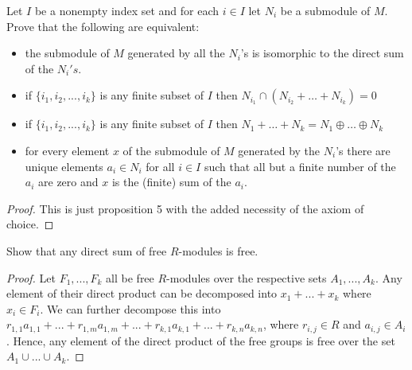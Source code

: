 \documentclass[10pt]{article}
\newenvironment{problem}[2][Problem]{\begin{trivlist}
		\item[\hskip \labelsep {\bfseries #1}\hskip \labelsep {\bfseries #2.}]}{\end{trivlist}}
\begin{document}
	\begin{problem}{3.21}
		Let $I$ be a nonempty index set and for each $i \in I$ let $N_i$ be a submodule of $M$. Prove that
		the following are equivalent:
		\begin{itemize}
			\item[\textbf{(i)}]the submodule of $M$ generated by all the $N_i$'s is isomorphic to the direct sum of the $N_i's$.
			\item[\textbf{(ii)}]if $\{i_1, i_2, ..., i_k\}$ is any finite subset of $I$ then $N_{i_1} \cap (N_{i_2} + \dots + N_{i_k}) = 0$
			\item[\textbf{(iii)}] if $\{i_1, i_2, ..., i_k\}$ is any finite subset of $I$ then $N_1 + \dots + N_k = N_1 \oplus \dots \oplus N_k$
			\item[\textbf{(iv)}] for every element $x$ of the submodule of $M$ generated by the $N_i$'s there are unique elements $a_i \in N_i$ for all $i \in I$ such that all but a finite number of the $a_i$ are zero and
			$x$ is the (finite) sum of the $a_i$.
		\end{itemize}
		\begin{proof}
			This is just proposition 5 with the added necessity of the axiom of choice. 
		\end{proof}
	\end{problem}
	
	\begin{problem}{3.23}
		Show that any direct sum of free $R$-modules is free.
		\begin{proof}
			Let $F_1, ..., F_k$ all be free $R$-modules over the respective sets $A_1, ..., A_k$. Any element of their direct product can be decomposed into $x_1 + ... + x_k$ where $x_i \in F_i$. We can further decompose this into $r_{1,1}a_{1,1} + ... + r_{1,m}a_{1,m} + ... + r_{k,1}a_{k,1} + ... + r_{k,n}a_{k,n}$, where $r_{i,j} \in R$ and $a_{i,j} \in A_i$. Hence, any element of the direct product of the free groups is free over the set $A_1 \cup ... \cup A_k$.
		\end{proof}
	\end{problem}
	
\end{document}
